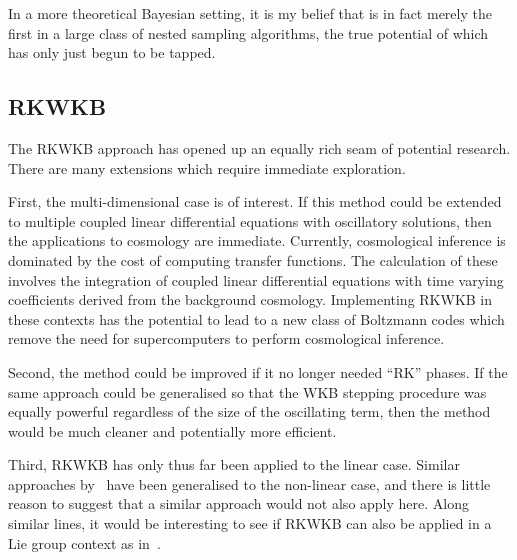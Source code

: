 In a more theoretical Bayesian setting, it is my belief that \PolyChord{} is in fact merely the first in a large class of nested sampling algorithms, the true potential of which has only just begun to be tapped.

\subsection*{RKWKB}
The RKWKB approach has opened up an equally rich seam of potential research. There are many extensions which require immediate exploration. 

First, the multi-dimensional case is of interest. If this method could be extended to multiple coupled linear differential equations with oscillatory solutions, then the applications to cosmology are immediate. Currently, cosmological inference is dominated by the cost of computing transfer functions. The calculation of these involves the integration of coupled linear differential equations with time varying coefficients derived from the background cosmology. Implementing RKWKB in these contexts has the potential to lead to a new class of Boltzmann codes which remove the need for supercomputers to perform cosmological inference.

Second, the method could be improved if it no longer needed ``RK'' phases. If the same approach could be generalised so that the WKB stepping procedure was equally powerful regardless of the size of the oscillating term, then the method would be much cleaner and potentially more efficient.

Third, RKWKB has only thus far been applied to the linear case. Similar approaches by~\cite{Iserles03onthe} have been generalised to the non-linear case, and there is little reason to suggest that a similar approach would not also apply here. Along similar lines, it would be interesting to see if RKWKB can also be applied in a Lie group context as in~\cite{Iserles00lie-groupmethods}.







